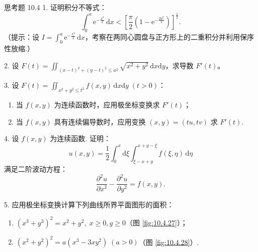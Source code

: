 \begin{exblock}{思考题 10.4}
1. 证明积分不等式：
\[
\int_0^a \mathrm{e}^{-\frac{x^2}{2}}\,\mathrm{d}x < \left[ \frac{\pi}{2}\left(1 - \mathrm{e}^{-\frac{2a^2}{\pi}}\right) \right]^{\frac{1}{2}}.
\]
（提示：设 $I = \int_0^a \mathrm{e}^{-\frac{x^2}{2}}\,\mathrm{d}x$，考察在两同心圆盘与正方形上的二重积分并利用保序性放缩.）

2. 设 $F(t) = \iint_{(x-t)^2+(y-t)^2 \leqslant a^2} \sqrt{x^2+y^2}\,\mathrm{d}x\mathrm{d}y$，求导数 $F'(t)$。

3. 设 $F(t) = \iint_{x^2+y^2 \leqslant t^2} f(x, y)\,\mathrm{d}x\mathrm{d}y\; (t > 0)$：
\begin{enumerate}
  \item 当 $f(x, y)$ 为连续函数时，应用极坐标变换求 $F'(t)$；
  \item 当 $f(x, y)$ 具有连续偏导数时，应用变换 $(x, y) = (tu, tv)$ 求 $F'(t)$.
\end{enumerate}

4. 设 $f(x, y)$ 为连续函数. 证明：
\[
u(x, y) = \frac{1}{2} \int_0^x \mathrm{d}\xi \int_{\xi-x+y}^{x+y-\xi} f(\xi, \eta)\,\mathrm{d}\eta
\]
满足二阶波动方程：
\[
\frac{\partial^2 u}{\partial x^2} - \frac{\partial^2 u}{\partial y^2} = f(x, y).
\]

5. 应用极坐标变换计算下列曲线所界平面图形的面积：
\begin{enumerate}
  \item $(x^3+y^3)^2 = x^2+y^2,\; x \geqslant 0, y \geqslant 0$（图 \ref{fig:10.4.27}）；
  \item $(x^2+y^2)^2 = a(x^3-3xy^2)\; (a > 0)$（图 \ref{fig:10.4.28}）.
\end{enumerate}


\end{exblock}
